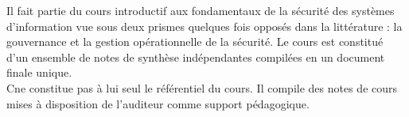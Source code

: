 

Il fait partie du cours introductif aux fondamentaux de la sécurité des systèmes d'information vue sous deux prismes quelques fois opposés dans la littérature : la gouvernance et la gestion opérationnelle de la sécurité.
Le cours est constitué d'un ensemble de notes de synthèse indépendantes compilées en un document finale unique.\\
C\edoc ne constitue pas à lui seul le référentiel du cours. Il compile des notes de cours mises à disposition de l'auditeur comme support pédagogique.